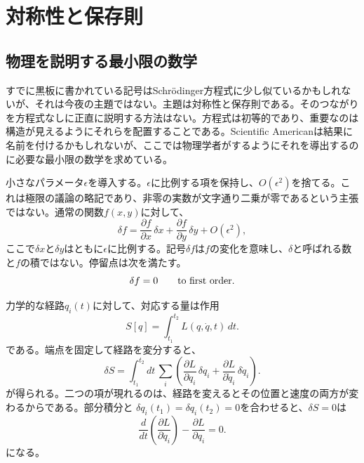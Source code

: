 \chapter{対称性と保存則}


\section{物理を説明する最小限の数学}

すでに黒板に書かれている記号はSchrödinger方程式に少し似ているかもしれないが、それは今夜の主題ではない。主題は対称性と保存則である。そのつながりを方程式なしに正直に説明する方法はない。方程式は初等的であり、重要なのは構造が見えるようにそれらを配置することである。Scientific Americanは結果に名前を付けるかもしれないが、ここでは物理学者がするようにそれを導出するのに必要な最小限の数学を求めている。

小さなパラメータ\(\epsilon\)を導入する。\(\epsilon\)に比例する項を保持し、\(O(\epsilon^2)\)を捨てる。これは極限の議論の略記であり、非零の実数が文字通り二乗が零であるという主張ではない。通常の関数\(f(x,y)\)に対して、
\begin{equation}
  \delta f
  =\frac{\partial f}{\partial x}\,\delta x
   +\frac{\partial f}{\partial y}\,\delta y
   +O(\epsilon^2),
  \label{eq:first-variation-f}
\end{equation}
ここで\(\delta x\)と\(\delta y\)はともに\(\epsilon\)に比例する。記号\(\delta f\)は\(f\)の変化を意味し、\(\delta\)と呼ばれる数と\(f\)の積ではない。停留点は次を満たす。
\begin{equation}
  \delta f=0
  \qquad\hbox{to first order.}
  \label{eq:stationary-f}
\end{equation}

力学的な経路\(q_i(t)\)に対して、対応する量は作用
\begin{equation}
  S[q]=\int_{t_1}^{t_2}L(q,\dot q,t)\,dt.
  \label{eq:action-l4}
\end{equation}
である。端点を固定して経路を変分すると、
\begin{equation}
  \delta S
  =\int_{t_1}^{t_2}dt\,
   \sum_i\left(
     \frac{\partial L}{\partial q_i}\,\delta q_i
     +\frac{\partial L}{\partial\dot q_i}\,\delta\dot q_i
   \right).
  \label{eq:action-variation-l4}
\end{equation}
が得られる。二つの項が現れるのは、経路を変えるとその位置と速度の両方が変わるからである。部分積分と
\(\delta q_i(t_1)=\delta q_i(t_2)=0\)を合わせると、\(\delta S=0\)は
\begin{equation}
  \frac{d}{dt}\left(\frac{\partial L}{\partial\dot q_i}\right)
  -\frac{\partial L}{\partial q_i}=0.
  \label{eq:el-l4}
\end{equation}
になる。

